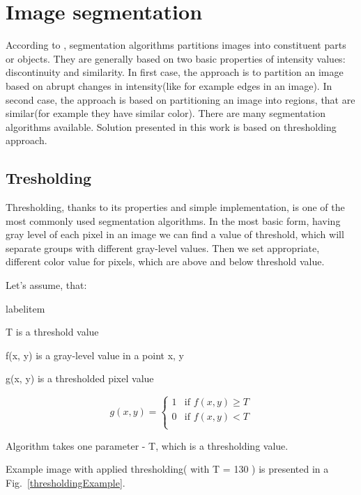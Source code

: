 \documentclass[a4paper,onecolumn,oneside,12pt]{memoir}
\makeatletter
\renewenvironment{itemize}{
  \begin{list}{  
  \csname labelitem\romannumeral\the\@listdepth\endcsname}{
  \setlength{\leftmargin}{1em}
	\setlength{\topsep}{6pt}%
	\setlength{\partopsep}{0pt}%
	\setlength{\parskip}{0pt}%
	\setlength{\parsep}{0pt}%
	\setlength{\itemsep}{0pt}}
}{
  \end{list}
}
\makeatother
\begin{document}
\section{Image segmentation}

According to \cite{digitalImageProcessing}, segmentation algorithms partitions images into 
constituent parts or objects. They are generally based on two basic properties of intensity values:
discontinuity and similarity. In first case, the approach is to partition an image based on abrupt
changes in intensity(like for example edges in an image). In second case, the approach is based on
partitioning an image into regions, that are similar(for example they have similar color). There
are many segmentation algorithms available. Solution presented in this work is based on thresholding
approach.

\subsection{Tresholding}

Thresholding, thanks to its properties and simple implementation, is one of the most commonly used
segmentation algorithms. In the most basic form, having gray level of each pixel in an image we can
find a value of threshold, which will separate groups with different gray-level values. Then we 
set appropriate, different color value for pixels, which are above and below threshold value.

Let's assume, that:
\begin{itemize}
  \item T is a threshold value
  \item f(x, y) is a gray-level value in a point x, y
  \item g(x, y) is a thresholded pixel value
\end{itemize}

$$
g(x, y) = \left\{ \begin{array}{ll}
1 & \textrm{if $f(x, y) \geq T$}\\
0 & \textrm{if $f(x, y) < T$}\\
\end{array} \right.
$$

Algorithm takes one parameter - T, which is a thresholding value.

Example image with applied thresholding( with T = 130 ) is presented in a 
Fig.~\ref{thresholdingExample}.
\end{document}

